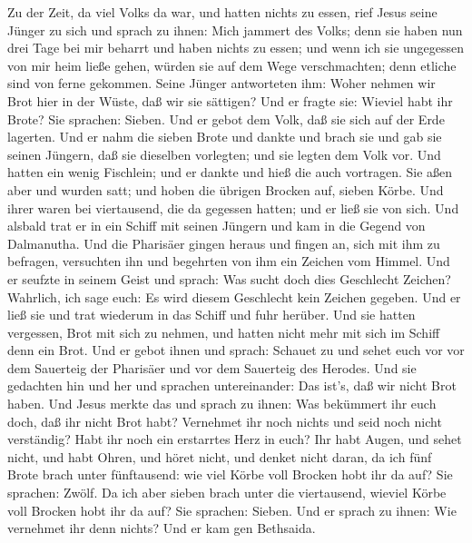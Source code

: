  Zu der Zeit, da viel Volks da war, und hatten nichts zu
essen, rief Jesus seine Jünger zu sich und sprach zu ihnen: 
Mich jammert des Volks; denn sie haben nun drei Tage bei mir beharrt und
haben nichts zu essen;  und wenn ich sie ungegessen von mir
heim ließe gehen, würden sie auf dem Wege verschmachten; denn etliche
sind von ferne gekommen.  Seine Jünger antworteten ihm:
Woher nehmen wir Brot hier in der Wüste, daß wir sie sättigen?
 Und er fragte sie: Wieviel habt ihr Brote? Sie sprachen:
Sieben.  Und er gebot dem Volk, daß sie sich auf der Erde
lagerten. Und er nahm die sieben Brote und dankte und brach sie und gab
sie seinen Jüngern, daß sie dieselben vorlegten; und sie legten dem Volk
vor.  Und hatten ein wenig Fischlein; und er dankte und hieß
die auch vortragen.  Sie aßen aber und wurden satt; und
hoben die übrigen Brocken auf, sieben Körbe.  Und ihrer
waren bei viertausend, die da gegessen hatten; und er ließ sie von sich.
 Und alsbald trat er in ein Schiff mit seinen Jüngern und
kam in die Gegend von Dalmanutha.  Und die Pharisäer gingen
heraus und fingen an, sich mit ihm zu befragen, versuchten ihn und
begehrten von ihm ein Zeichen vom Himmel.  Und er seufzte
in seinem Geist und sprach: Was sucht doch dies Geschlecht Zeichen?
Wahrlich, ich sage euch: Es wird diesem Geschlecht kein Zeichen gegeben.
 Und er ließ sie und trat wiederum in das Schiff und fuhr
herüber.  Und sie hatten vergessen, Brot mit sich zu
nehmen, und hatten nicht mehr mit sich im Schiff denn ein Brot.
 Und er gebot ihnen und sprach: Schauet zu und sehet euch
vor vor dem Sauerteig der Pharisäer und vor dem Sauerteig des Herodes.
 Und sie gedachten hin und her und sprachen untereinander:
Das ist's, daß wir nicht Brot haben.  Und Jesus merkte das
und sprach zu ihnen: Was bekümmert ihr euch doch, daß ihr nicht Brot
habt? Vernehmet ihr noch nichts und seid noch nicht verständig? Habt ihr
noch ein erstarrtes Herz in euch?  Ihr habt Augen, und
sehet nicht, und habt Ohren, und höret nicht, und denket nicht daran,
 da ich fünf Brote brach unter fünftausend: wie viel Körbe
voll Brocken hobt ihr da auf? Sie sprachen: Zwölf.  Da ich
aber sieben brach unter die viertausend, wieviel Körbe voll Brocken hobt
ihr da auf? Sie sprachen: Sieben.  Und er sprach zu ihnen:
Wie vernehmet ihr denn nichts?  Und er kam gen Bethsaida.
